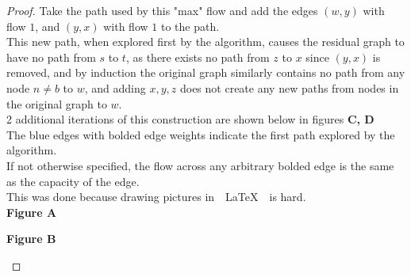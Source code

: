 \begin{problem}
\begin{proof}
  Take the path used by this "max" flow and add the edges $(w, y)$ with flow $1$, and $(y, x)$ with flow $1$ to the path. \\
  This new path, when explored first by the algorithm, causes the residual graph to have no path from $s$ to $t$, as there exists no path from $z$ to $x$ since $(y, x)$ is removed,
  and by induction the original graph similarly contains no path from any node $n \neq b$ to $w$, and adding $x, y, z$ does not create any new paths from nodes in the original graph to $w$. \\
  2 additional iterations of this construction are shown below in figures \textbf{C, D} \\
  The blue edges with bolded edge weights indicate the first path explored by the algorithm. \\
  If not otherwise specified, the flow across any arbitrary bolded edge is the same as the capacity of the edge. \\
  This was done because drawing pictures in~~\LaTeX~~is hard. \\
  \vspace{5mm}
  \textbf{Figure A}
  \begin{center}
  \end{center}
  \vspace{5mm}
  \textbf{Figure B}
  \begin{center}
\end{center}
\end{proof}
\end{problem}
